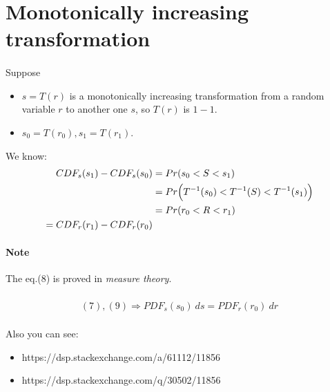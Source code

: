 \documentclass[a4paper]{article}
\begin{document}
\pagebreak

\section{Monotonically increasing transformation}

\paragraph*{}{
    
    Suppose
    \begin{itemize}
        \item $s = T(r)$ is a monotonically increasing transformation from a random variable $r$ to another one $s$, so $T(r)$ is $1-1$.
        \item $s_0 = T(r_0), s_1 = T(r_1)$.
    \end{itemize}

    We know:
    \begin{align}
        CDF_s(s_1) - CDF_s(s_0) &= Pr(s_0 < S < s_1) \nonumber \\
        &= Pr\Bigl(T^{-1}(s_0) < T^{-1}(S) < T^{-1}(s_1)\Bigr) \\
        &=Pr(r_0 < R < r_1) \nonumber \\
        =CDF_r(r_1) - CDF_r(r_0)
    \end{align}
}
\paragraph*{Note} The eq.(8) is proved in \emph{measure theory}.

\paragraph*{}{
    \begin{align}
        (7),(9) \Rightarrow PDF_s(s_0) \ ds = PDF_r(r_0) \ dr
    \end{align}
}

\paragraph*{}{
    
Also you can see:
\begin{itemize}
    \item https://dsp.stackexchange.com/a/61112/11856
    \item https://dsp.stackexchange.com/q/30502/11856
\end{itemize}
}
\end{document}
